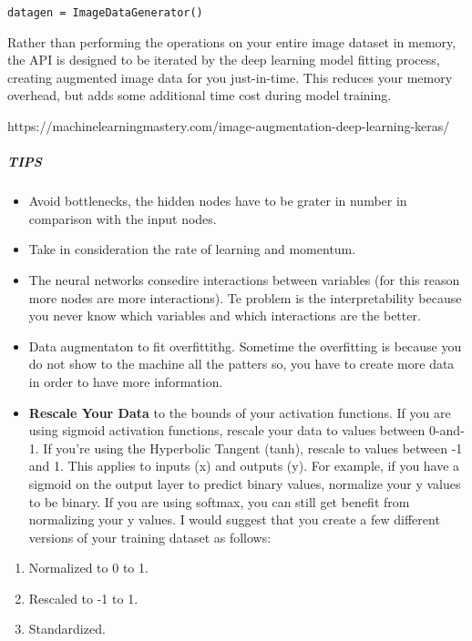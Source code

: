 \documentclass[11pt]{article}
\providecommand{\tightlist}{%
      \setlength{\itemsep}{0pt}\setlength{\parskip}{0pt}}
\begin{document}
\texttt{datagen\ =\ ImageDataGenerator()}

Rather than performing the operations on your entire image dataset in
memory, the API is designed to be iterated by the deep learning model
fitting process, creating augmented image data for you just-in-time.
This reduces your memory overhead, but adds some additional time cost
during model training.

https://machinelearningmastery.com/image-augmentation-deep-learning-keras/

\hypertarget{tips}{%
\subparagraph{TIPS}\label{tips}}

\begin{itemize}
\item
  Avoid bottlenecks, the hidden nodes have to be grater in number in
  comparison with the input nodes.
\item
  Take in consideration the rate of learning and momentum.
\item
  The neural networks consedire interactions between variables (for this
  reason more nodes are more interactions). Te problem is the
  interpretability because you never know which variables and which
  interactions are the better.
\item
  Data augmentaton to fit overfittithg. Sometime the overfitting is
  because you do not show to the machine all the patters so, you have to
  create more data in order to have more information.
\item
  \textbf{Rescale Your Data} to the bounds of your activation functions.
  If you are using sigmoid activation functions, rescale your data to
  values between 0-and-1. If you're using the Hyperbolic Tangent (tanh),
  rescale to values between -1 and 1. This applies to inputs (x) and
  outputs (y). For example, if you have a sigmoid on the output layer to
  predict binary values, normalize your y values to be binary. If you
  are using softmax, you can still get benefit from normalizing your y
  values. I would suggest that you create a few different versions of
  your training dataset as follows:
\end{itemize}

\begin{enumerate}
\def\labelenumi{\arabic{enumi}.}
\tightlist
\item
  Normalized to 0 to 1.
\item
  Rescaled to -1 to 1.
\item
  Standardized.
\end{enumerate}
\end{document}
